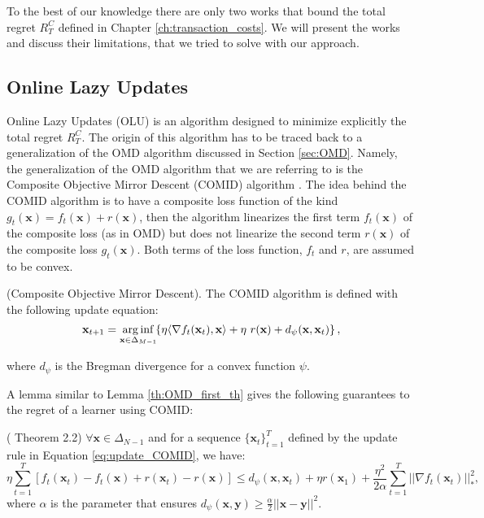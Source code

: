 To the best of our knowledge there are only two works that bound the total regret $R_T^C$ defined in Chapter \ref{ch:transaction_costs}. We will present the works and discuss their limitations, that we tried to solve with our approach.

\subsection{Online Lazy Updates}\label{sec:OLU}

Online Lazy Updates (OLU) \cite{das2013online} is an algorithm designed to minimize explicitly the total regret $R_T^C$. The origin of this algorithm has to be traced back to a generalization of the OMD algorithm discussed in Section \ref{sec:OMD}. Namely, the generalization of the OMD algorithm that we are referring to is the Composite Objective Mirror Descent (COMID) algorithm \cite{duchi2010composite}. The idea behind the COMID algorithm is to have a composite loss function of the kind $g_t(\mathbf x)=f_t(\mathbf x) + r(\mathbf x)$, then the algorithm linearizes the first term $f_t(\mathbf x)$ of the composite loss (as in OMD) but does not linearize the second term $r(\mathbf x)$ of the composite loss $g_t(\mathbf x)$. Both terms of the loss function, $f_t$ and $r$, are assumed to be convex.

\begin{definition}(Composite Objective Mirror Descent).\label{def:COMID}
The COMID algorithm is defined with the following update equation:
\begin{equation}\label{eq:update_COMID}
    \mathbf{x}_{t+1}=\arginf\limits_{\mathbf{x} \in \Delta_{M-1}} \hspace{-0.1cm} \left\{ \eta \langle \nabla f_t(\mathbf{x}_t), \mathbf{x} \rangle + \eta \ r(\mathbf{x}) + d_\psi(\mathbf{x}, \mathbf{x}_t) \right\},
\end{equation}

where $d_\psi$ is the Bregman divergence for a convex function $\psi$. 

\end{definition}

A lemma similar to Lemma \ref{th:OMD_first_th} gives the following guarantees to the regret of a learner using COMID:

\begin{lemma}(\cite{duchi2010composite} Theorem 2.2)
$\forall \mathbf x\in\Delta_{N-1}$ and for a sequence $\{\mathbf x_t\}_{t=1}^T$ defined by the update rule in Equation \eqref{eq:update_COMID}, we have:
\begin{equation}
\eta\sum\limits_{t=1}^T[f_t(\mathbf x_t)-f_t(\mathbf x)+r(\mathbf x_t)-r(\mathbf x)]\le d_\psi(\mathbf x,\mathbf x_t)+\eta r(\mathbf x_1)+\frac{\eta^2}{2\alpha}\sum\limits_{t=1}^T||\nabla f_t(\mathbf x_t)||_*^2,
\end{equation} 
where $\alpha$ is the parameter that ensures $d_\psi(\mathbf x,\mathbf y)\ge \frac{\alpha}{2}||\mathbf x-\mathbf y||^2$.
\end{lemma}

